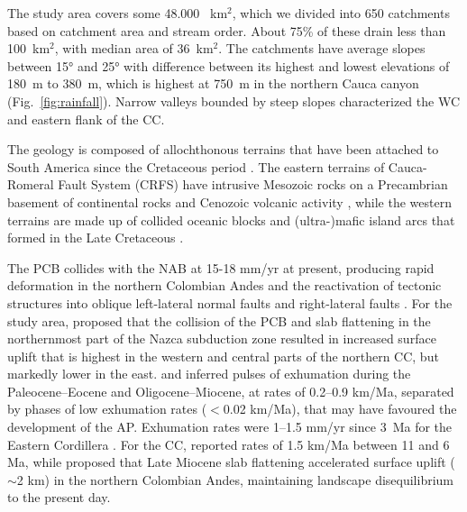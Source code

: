 \documentclass[draft]{agujournal2019}
\begin{document}
\par The study area covers some 48.000~ km$^2$, which we divided into 650 catchments based on catchment area and stream order. About 75\% of these drain less than 100~km$^{2}$, with median area of 36~km$^{2}$. The catchments have average slopes between 15° and 25° with difference between its highest and lowest elevations of 180~m to 380~m, which is highest at 750~m in the northern Cauca canyon (Fig.~\ref{fig:rainfall}). Narrow valleys bounded by steep slopes characterized the WC and eastern flank of the CC. 

\par The geology is composed of allochthonous terrains that have been attached to South America since the Cretaceous period \cite{Cediel2003}. The eastern terrains of Cauca-Romeral Fault System (CRFS) have intrusive Mesozoic rocks on a Precambrian basement of continental rocks and Cenozoic volcanic activity \cite{Cediel2003}, while the western terrains are made up of collided oceanic blocks and (ultra-)mafic island arcs that formed in the Late Cretaceous \cite{cardona2012arc}.

\par The PCB collides with the NAB at 15-18 mm/yr at present, producing rapid deformation in the northern Colombian Andes \cite{kellogg2019} and the reactivation of tectonic structures into oblique left-lateral normal faults and right-lateral faults \cite{acosta2007}. For the study area,  proposed that the collision of the PCB and slab flattening in the northernmost part of the Nazca subduction zone resulted in increased surface uplift that is highest in the western and central parts of the northern CC, but markedly lower in the east.  and  inferred pulses of exhumation during the Paleocene–Eocene and Oligocene–Miocene, at rates of 0.2–0.9 km/Ma, separated by phases of low exhumation rates ($<$0.02 km/Ma), that may have favoured the development of the AP. Exhumation rates were 1–1.5 mm/yr since 3~Ma for the Eastern Cordillera \cite{mora2010}. For the CC,  reported rates of 1.5 km/Ma between 11 and 6 Ma, while  proposed that Late Miocene slab ﬂattening accelerated surface uplift ($\sim$2 km) in the northern Colombian Andes, maintaining landscape disequilibrium to the present day.
\end{document}
